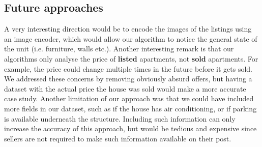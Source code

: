 \documentclass{article}
\begin{document}
\subsection{Future approaches}
A very interesting direction would be to encode the images of the listings using an image encoder, which would allow our algorithm to notice the general state of the unit (i.e. furniture, walls etc.).
Another interesting remark is that our algorithms only analyse the price of \textbf{listed} apartments, not \textbf{sold} apartments. For example, the price could change multiple times in the future before it gets sold. We addressed these concerns by removing obviously absurd offers, but having a dataset with the actual price the house was sold would make a more accurate case study.
Another limitation of our approach was that we could have included more fields in our dataset, such as if the house has air conditioning, or if parking is available underneath the structure. Including such information can only increase the accuracy of this approach, but would be tedious and expensive since sellers are not required to make such information available on their post. 
\nocite{*}


\end{document}
